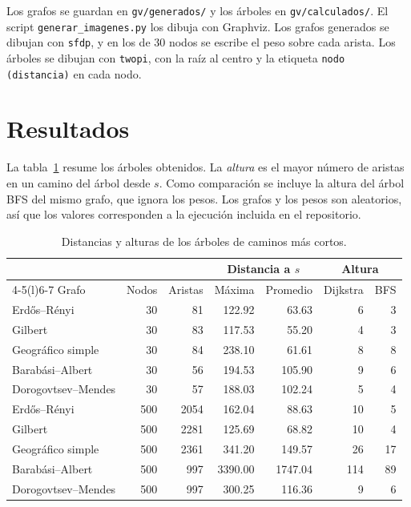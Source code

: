 \documentclass[11pt,letterpaper]{article}
\begin{document}
Los grafos se guardan en \texttt{gv/generados/} y los árboles en
\texttt{gv/calculados/}. El script \texttt{generar\_imagenes.py} los dibuja con
Graphviz. Los grafos generados se dibujan con \texttt{sfdp}, y en los de 30 nodos
se escribe el peso sobre cada arista. Los árboles se dibujan con \texttt{twopi},
con la raíz al centro y la etiqueta \texttt{nodo (distancia)} en cada nodo.

\section{Resultados}

La tabla~\ref{tab:resultados} resume los árboles obtenidos. La \emph{altura} es el
mayor número de aristas en un camino del árbol desde $s$. Como comparación se
incluye la altura del árbol BFS del mismo grafo, que ignora los pesos. Los grafos y
los pesos son aleatorios, así que los valores corresponden a la ejecución incluida
en el repositorio.

\begin{table}[H]
\centering
\begin{tabular}{lrrrrrr}
\toprule
 & & & \multicolumn{2}{c}{Distancia a $s$} & \multicolumn{2}{c}{Altura} \\
\cmidrule(lr){4-5}\cmidrule(l){6-7}
Grafo & Nodos & Aristas & Máxima & Promedio & Dijkstra & BFS \\
\midrule
Erd\H{o}s--Rényi & 30 & 81 & 122.92 & 63.63 & 6 & 3 \\
Gilbert & 30 & 83 & 117.53 & 55.20 & 4 & 3 \\
Geográfico simple & 30 & 84 & 238.10 & 61.61 & 8 & 8 \\
Barabási--Albert & 30 & 56 & 194.53 & 105.90 & 9 & 6 \\
Dorogovtsev--Mendes & 30 & 57 & 188.03 & 102.24 & 5 & 4 \\
\midrule
Erd\H{o}s--Rényi & 500 & 2054 & 162.04 & 88.63 & 10 & 5 \\
Gilbert & 500 & 2281 & 125.69 & 68.82 & 10 & 4 \\
Geográfico simple & 500 & 2361 & 341.20 & 149.57 & 26 & 17 \\
Barabási--Albert & 500 & 997 & 3390.00 & 1747.04 & 114 & 89 \\
Dorogovtsev--Mendes & 500 & 997 & 300.25 & 116.36 & 9 & 6 \\
\bottomrule
\end{tabular}
\caption{Distancias y alturas de los árboles de caminos más cortos.}
\label{tab:resultados}
\end{table}
\end{document}
